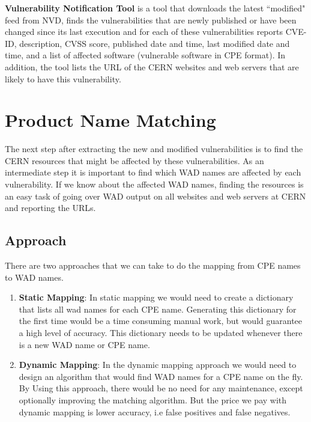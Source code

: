 \begin{framed}
\textbf{Vulnerability Notification Tool} is a tool that downloads the latest ``modified" feed from NVD, finds the vulnerabilities that are newly published or have been changed since its last execution and for each of these vulnerabilities reports CVE-ID, description, CVSS score, published date and time, last modified date and time, and a list of affected software (vulnerable software in CPE format). In addition, the tool lists the URL of the CERN websites and web servers that are likely to have this vulnerability.
\end{framed} 


\section{Product Name Matching}
\label{name_matching}
The next step after extracting the new and modified vulnerabilities is to find the CERN resources that might be affected by these vulnerabilities. As an intermediate step it is important to find which WAD names are affected by each vulnerability. If we know about the affected WAD names, finding the resources is an easy task of going over WAD output on all websites and web servers at CERN and reporting the URLs. 


\subsection{Approach}

There are two approaches that we can take to do the mapping from CPE names to WAD names.
\begin{enumerate}
\item \textbf{Static Mapping}: In static mapping we would need to create a dictionary that lists all wad names for each CPE name. Generating this dictionary for the first time would be a time consuming manual work, but would guarantee a high level of accuracy. This dictionary needs to be updated whenever there is a new WAD name or CPE name. 
\item \textbf{Dynamic Mapping}: In the dynamic mapping approach we would need to design an algorithm that would find WAD names for a CPE name on the fly. By Using this approach, there would be no need for any maintenance, except optionally improving the matching algorithm. But the price we pay with dynamic mapping is lower accuracy, i.e false positives and false negatives.  
\end{enumerate} 


